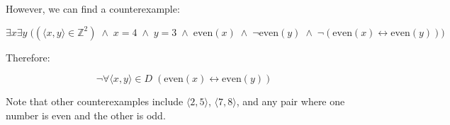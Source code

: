 However, we can find a counterexample:

\[
\exists x \exists y \;\big((\langle x, y \rangle \in \mathbb{Z}^2) \;\land\; x = 4 \;\land\; y = 3 \;\land\; \text{even}(x) \;\land\; \neg\text{even}(y) \;\land\; \neg(\text{even}(x) \leftrightarrow \text{even}(y))\big)
\]

Therefore:

\[\boxed{\neg \forall \langle x,y \rangle \in D \;(\text{even}(x) \leftrightarrow \text{even}(y))}\]

Note that other counterexamples include \(\langle 2,5 \rangle\),
\(\langle 7,8 \rangle\), and any pair where one number is even and the
other is odd.
